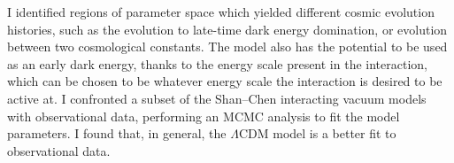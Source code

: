 \documentclass[11pt]{article}
\begin{document}
    I identified regions of parameter space which yielded different cosmic evolution histories, such as the evolution to late-time dark energy domination, or evolution between two cosmological constants. The model also has the potential to be used as an early dark energy, thanks to the energy scale present in the interaction, which can be chosen to be whatever energy scale the interaction is desired to be active at. I confronted a subset of the Shan--Chen interacting vacuum models with observational data, performing an MCMC analysis to fit the model parameters. I found that, in general, the $\Lambda$CDM model is a better fit to observational data.
    
    
    
	
\end{document}
